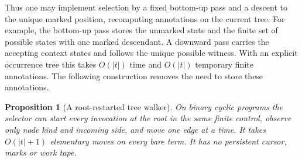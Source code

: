 \documentclass[11pt,letterpaper,oneside,reqno]{amsart}
\newtheorem{prop}[theorem]{Proposition}
\begin{document}
Thus one may implement selection by a fixed bottom-up pass and a descent to the unique marked position, recomputing annotations on the current tree. For example, the bottom-up pass stores the unmarked state and the finite set of possible states with one marked descendant. A downward pass carries the accepting context states and follows the unique possible witness. With an explicit occurrence tree this takes \(O(|t|)\) time and \(O(|t|)\) temporary finite annotations. The following construction removes the need to store these annotations.

\begin{prop}[A root-restarted tree walker]\label{walker}
On binary cyclic programs the selector can start every invocation at the root in the same finite control, observe only node kind and incoming side, and move one edge at a time. It takes \(O(|t|+1)\) elementary moves on every bare term. It has no persistent cursor, marks or work tape.
\end{prop}
\end{document}
